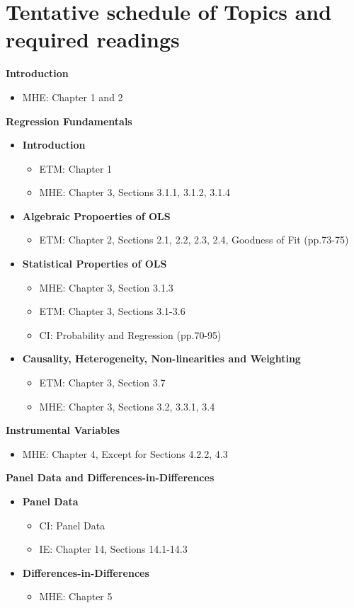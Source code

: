 \documentclass[letterpaper,12pt]{article}
\theoremstyle{dotlessS}
\begin{document}
\section*{Tentative schedule of Topics and required readings}
\textbf{Introduction}
\begin{itemize}
\item MHE: Chapter 1 and 2
\end{itemize}
\textbf{Regression Fundamentals}
\begin{itemize}
\item \textbf{Introduction}
\begin{itemize}
\item ETM: Chapter 1
\item MHE: Chapter 3, Sections 3.1.1, 3.1.2, 3.1.4
\end{itemize}
\item \textbf{Algebraic Propoerties of OLS}
\begin{itemize}
\item ETM: Chapter 2, Sections 2.1, 2.2, 2.3, 2.4, Goodness of Fit (pp.73-75)
\end{itemize}
\item \textbf{Statistical Properties of OLS}
\begin{itemize}
\item MHE: Chapter 3, Section 3.1.3
\item ETM: Chapter 3, Sections 3.1-3.6
\item CI: Probability and Regression (pp.70-95)
\end{itemize}
\item \textbf{Causality, Heterogeneity, Non-linearities and Weighting}
\begin{itemize}
\item ETM: Chapter 3, Section 3.7
\item MHE: Chapter 3, Sections 3.2, 3.3.1, 3.4
\end{itemize}
\end{itemize}
\newpage
\noindent \textbf{Instrumental Variables}
\begin{itemize}
\item MHE: Chapter 4, Except for Sections 4.2.2, 4.3
\end{itemize}
\textbf{Panel Data and Differences-in-Differences}
\begin{itemize}
\item \textbf{Panel Data}
\begin{itemize}
\item CI: Panel Data
\item IE: Chapter 14, Sections 14.1-14.3
\end{itemize}
\item \textbf{Differences-in-Differences}
\begin{itemize}
\item MHE: Chapter 5
\end{itemize}
\end{itemize}
\end{document}
